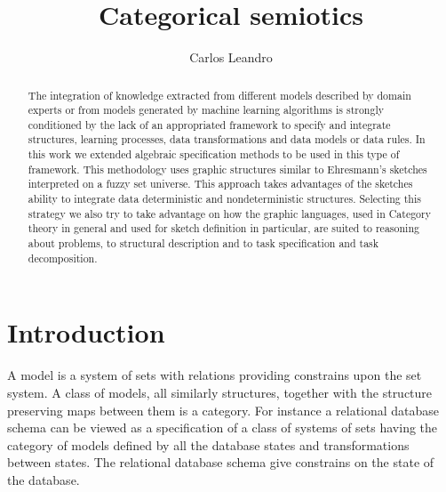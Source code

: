 \documentclass[oribibl]{llncs}
\begin{document}
\title{Categorical semiotics}

\author{ Carlos Leandro}








\begin{abstract}
The integration of knowledge extracted from different models described by domain experts or from models generated by machine learning algorithms is strongly conditioned by the lack of an appropriated framework to specify and integrate structures, learning processes, data transformations and data models or data rules. In this work we extended algebraic specification methods to be used in this  type of framework. This methodology uses graphic structures similar to Ehresmann's sketches \cite{Adamek94}  interpreted on a fuzzy set universe. This approach takes advantages of the sketches ability to integrate data deterministic and nondeterministic structures. Selecting this strategy we also try to take advantage on how the graphic languages, used in Category theory in general and used for sketch definition in particular, are suited to reasoning about problems, to structural description and to task specification and task decomposition.
\end{abstract}

\maketitle


\section*{Introduction}

A model is a system of sets with relations providing
constrains upon the set system. A class of models, all similarly
structures, together with the structure preserving maps between them
is a category. For instance a relational database schema can be
viewed as a specification of a class of systems of sets having the
category of models defined by all the database states and
transformations between states. The relational database schema give
constrains on the state of the database.
\end{document}
